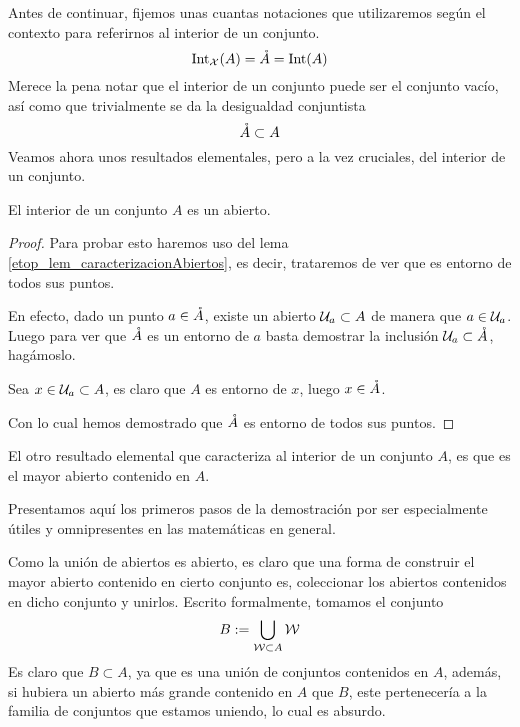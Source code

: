 Antes de continuar, fijemos unas cuantas notaciones que utilizaremos según el contexto para referirnos al interior de un conjunto.
\begin{equation}
\label{etop_eq_notacionInterior}
	\operatorname{\mathrm{Int}}_{\mathcal{X}}(A)=\mathring{A}=\operatorname{\mathrm{Int}}(A)
\end{equation}
Merece la pena notar que el interior de un conjunto puede ser el conjunto vacío, así como que trivialmente se da la desigualdad conjuntista
\begin{equation}
\label{etop_eq_desigualdadInterior1}
	\mathring{A}\subset A
\end{equation}
Veamos ahora unos resultados elementales, pero a la vez cruciales, del interior de un conjunto.
\begin{lem}[Apertura]
	\label{etop_lem_aperturaInterior}
	El interior de un conjunto $A$ es un abierto.
\end{lem}
\begin{proof}
	Para probar esto haremos uso del lema \ref{etop_lem_caracterizacionAbiertos}, es decir, trataremos de ver que es entorno de todos sus puntos.
	
	En efecto, dado un punto $a\in\mathring{A}$, existe un abierto $\mathcal{U}_a\subset A$ de manera que $a\in\mathcal{U}_a$. Luego para ver que $\mathring{A}$ es un entorno de $a$ basta demostrar la inclusión $\mathcal{U}_a\subset\mathring{A}$, hagámoslo.
	
	Sea $x\in\mathcal{U}_a\subset A$, es claro que $A$ es entorno de $x$, luego $x\in\mathring{A}$.
	
	Con lo cual hemos demostrado que $\mathring{A}$ es entorno de todos sus puntos.
\end{proof}

El otro resultado elemental que caracteriza al interior de un conjunto $A$, es que es el mayor abierto contenido en $A$.

Presentamos aquí los primeros pasos de la demostración por ser especialmente útiles y omnipresentes en las matemáticas en general.

Como la unión de abiertos es abierto, es claro que una forma de construir el mayor abierto contenido en cierto conjunto es, coleccionar los abiertos contenidos en dicho conjunto y unirlos. Escrito formalmente, tomamos el conjunto
\begin{equation}
\label{etop_eq_mayorAbierto}
	B:=\bigcup_{\mathcal{W}\subset A}\mathcal{W}
\end{equation}
Es claro que $B\subset A$, ya que es una unión de conjuntos contenidos en $A$, además, si hubiera un abierto más grande contenido en $A$ que $B$, este pertenecería a la familia de conjuntos que estamos uniendo, lo cual es absurdo.

